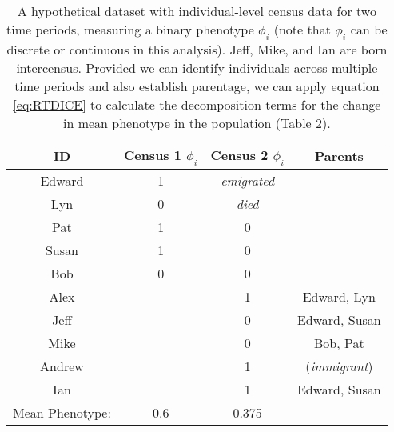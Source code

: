 \documentclass[11pt]{article}
\begin{document}
		\begin{table}[htbp]
    \begin{center}
    \begin{footnotesize}
    \begin{tabular}{cccc}
    \hline
    \hline
    ID    & Census 1 $\phi_i$ & Census 2 $\phi_i$ & Parents \\
    \hline
    Edward & 1     & \textit{emigrated} &  \\
    Lyn   & 0     & \textit{died}  &  \\
    Pat   & 1     & 0     &  \\
    Susan & 1     & 0     &  \\
    Bob   & 0     & 0     &  \\
    Alex      &   & 1     & Edward, Lyn \\
    Jeff      &   & 0     & Edward, Susan \\
    Mike      &    & 0     & Bob, Pat \\
    Andrew      &  & 1     & (\textit{immigrant})\\
    Ian      &     & 1     & Edward, Susan \\
    \hline
		Mean Phenotype: & 0.6 & 0.375 & \\
		\hline
		
	 	\end{tabular}
	  \caption{A hypothetical dataset with individual-level census data for two time periods, measuring a binary phenotype $\phi_i$ (note that $\phi_i$ can be discrete or continuous in this analysis).  Jeff, Mike, and Ian are born intercensus.  Provided we can identify individuals across multiple time periods and also establish parentage, we can apply equation \ref{eq:RTDICE} to calculate the decomposition terms for the change in mean phenotype in the population (Table 2).}
		\label{tab:DemoData}
		\end{footnotesize}
		\end{center}
		\end{table}
\end{document}
